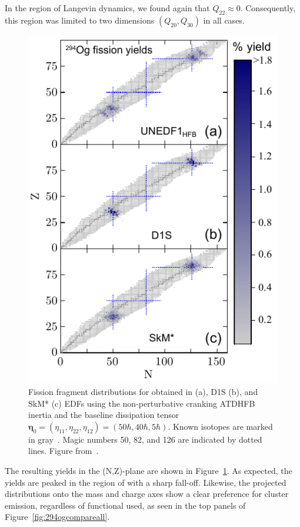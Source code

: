 In the region of Langevin dynamics, we found again that $Q_{22} \approx 0$. Consequently, this region was limited to two dimensions $(Q_{20}, Q_{30})$ in all cases.

\begin{figure}
	\centering
	\includegraphics[width=0.9\linewidth]{TeX_files/294Og_3yields}
	\caption{Fission fragment distributions for \Og{} obtained in \hfb{} (a), D1S (b), and SkM* (c) EDFs using the non-perturbative cranking ATDHFB inertia and  the baseline  dissipation tensor $\mathbf{\eta}_0 = (\eta_{11},\eta_{22},\eta_{12}) = (50\hbar,40\hbar,5\hbar)$. Known isotopes are marked in gray~\cite{NuDat}. Magic numbers 50, 82, and 126 are indicated by dotted lines. Figure from~\cite{matheson2019}.}
	\label{fig:294og3yields}
\end{figure}

The resulting yields in the (N,Z)-plane are shown in Figure~\ref{fig:294og3yields}. As expected, the yields are peaked in the region of {\Pb} with a sharp fall-off. Likewise, the projected distributions onto the mass and charge axes show a clear preference for cluster emission, regardless of functional used, as seen in the top panels of Figure~\ref{fig:294ogcompareall}.


